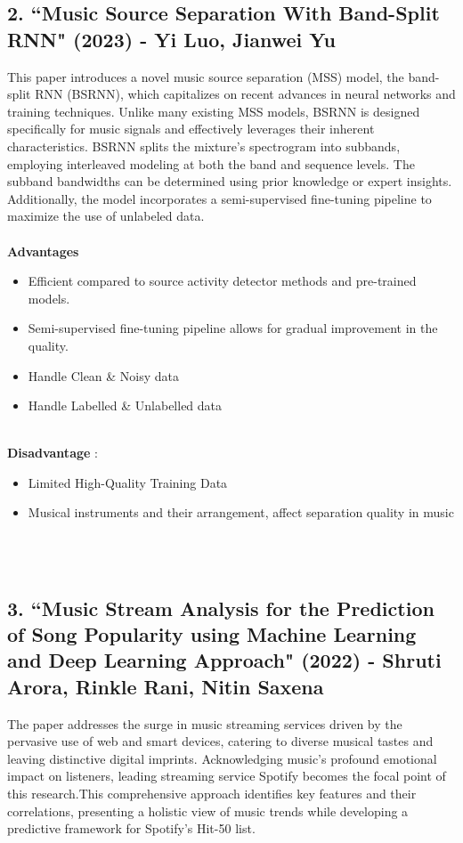 \documentclass[11pt]{report}
\begin{document}
\subsection*{2. ``Music Source Separation With Band-Split RNN" (2023) - Yi Luo, Jianwei Yu\cite{reference2}}
This paper introduces a novel music source separation (MSS) model, the band-split RNN (BSRNN), which capitalizes on recent advances in neural networks and training techniques. Unlike many existing MSS models, BSRNN is designed specifically for music signals and effectively leverages their inherent characteristics. BSRNN splits the mixture’s spectrogram into subbands, employing interleaved modeling at both the band and sequence levels. The subband bandwidths can be determined using prior knowledge or expert insights. Additionally, the model incorporates a semi-supervised fine-tuning pipeline to maximize the use of unlabeled data.
\\  \\
\textbf{Advantages}
    \begin{itemize}
        \item Efficient compared to source activity detector methods and pre-trained models.
        \item Semi-supervised fine-tuning pipeline allows for gradual improvement in the quality.
        \item Handle Clean & Noisy data
        \item Handle Labelled & Unlabelled data
    \end{itemize}
\\
\textbf{Disadvantage} :  

 \begin{itemize}
        \item Limited High-Quality Training Data
        \item Musical instruments and their arrangement, affect separation quality in music 
    \end{itemize}

\\\\
\subsection*{3.  ``Music Stream Analysis for the Prediction of Song Popularity using Machine Learning and Deep Learning Approach" (2022) - Shruti Arora, Rinkle Rani, Nitin Saxena\cite{reference3}}
The paper addresses the surge in music streaming services driven by the pervasive use of web and smart devices, catering to diverse musical tastes and leaving distinctive digital imprints. Acknowledging music's profound emotional impact on listeners, leading streaming service Spotify becomes the focal point of this research.This comprehensive approach identifies key features and their correlations, presenting a holistic view of music trends while developing a predictive framework for Spotify's Hit-50 list.
\end{document}
